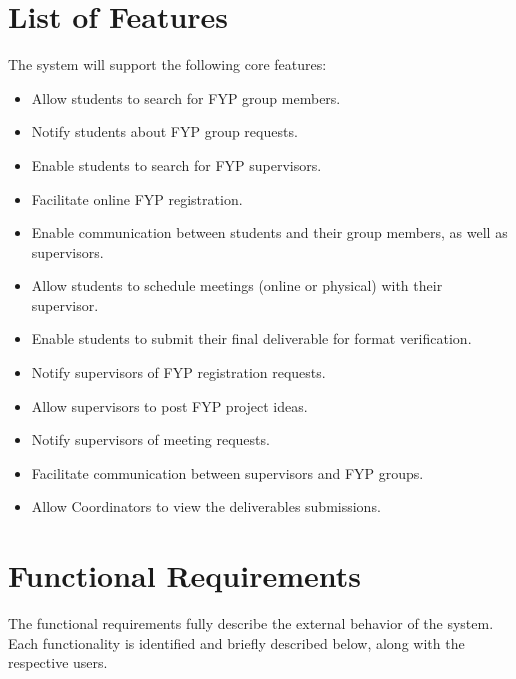 \documentclass{FastFyp}
\begin{document}
\section{List of Features}
The system will support the following core features:
\begin{itemize}
    \item Allow students to search for FYP group members.
    \item Notify students about FYP group requests.
    \item Enable students to search for FYP supervisors.
    \item Facilitate online FYP registration.
    \item Enable communication between students and their group members, as well as supervisors.
    \item Allow students to schedule meetings (online or physical) with their supervisor.
    \item Enable students to submit their final deliverable for format verification.
    \item Notify supervisors of FYP registration requests.
    \item Allow supervisors to post FYP project ideas.
    \item Notify supervisors of meeting requests.
    \item Facilitate communication between supervisors and FYP groups.
    \item Allow Coordinators to view the deliverables submissions.
\end{itemize}
\section{Functional Requirements}

The functional requirements fully describe the external behavior of the system. Each functionality is identified and briefly described below, along with the respective users.
\end{document}
